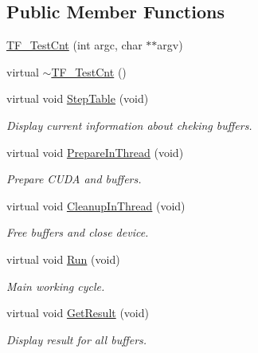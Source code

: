 \subsection*{Public Member Functions}
\begin{DoxyCompactItemize}
\item 
\hyperlink{classTF__TestCnt_a383dec3bead32626029801edceb9e73d}{TF\_\-TestCnt} (int argc, char $\ast$$\ast$argv)
\item 
virtual \hyperlink{classTF__TestCnt_a05aac39696c9db049193b3a49a389521}{$\sim$TF\_\-TestCnt} ()
\item 
virtual void \hyperlink{classTF__TestCnt_ac1a136199115958172e96ef4c9212351}{StepTable} (void)
\begin{DoxyCompactList}\small\item\em Display current information about cheking buffers. \item\end{DoxyCompactList}\item 
virtual void \hyperlink{classTF__TestCnt_a294a67b58d75600172433b8fae006a3e}{PrepareInThread} (void)
\begin{DoxyCompactList}\small\item\em Prepare CUDA and buffers. \item\end{DoxyCompactList}\item 
virtual void \hyperlink{classTF__TestCnt_a95c7a76a1fe574d1ed260a07f9469501}{CleanupInThread} (void)
\begin{DoxyCompactList}\small\item\em Free buffers and close device. \item\end{DoxyCompactList}\item 
virtual void \hyperlink{classTF__TestCnt_aa7b667d47ddc70942ff2ff73074c7696}{Run} (void)
\begin{DoxyCompactList}\small\item\em Main working cycle. \item\end{DoxyCompactList}\item 
virtual void \hyperlink{classTF__TestCnt_af1d8c610c3b708401c19ad8256db27be}{GetResult} (void)
\begin{DoxyCompactList}\small\item\em Display result for all buffers. \item\end{DoxyCompactList}\item 
$$
\end{DoxyCompactItemize}
